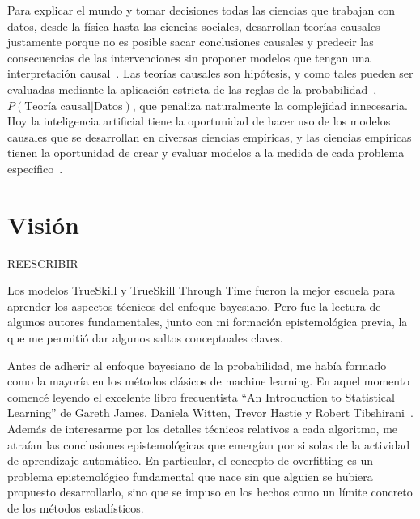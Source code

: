\documentclass[a4paper,11pt]{book}
\theoremstyle{definition}
\begin{document}
%

Para explicar el mundo y tomar decisiones todas las ciencias que trabajan con datos, desde la f\'isica hasta las ciencias sociales, desarrollan teor\'ias causales justamente porque no es posible sacar conclusiones causales y predecir las consecuencias de las intervenciones sin proponer modelos que tengan una interpretaci\'on causal~\cite{pearl2009-causality, peters2017-causalInference}.
%
Las teor\'ias causales son hip\'otesis, y como tales pueden ser evaluadas mediante la aplicaci\'on estricta de las reglas de la probabilidad~\cite{winn2012-causality}, $P(\text{Teor\'ia causal}|\text{Datos})$, que penaliza naturalmente la complejidad innecesaria.
%
Hoy la inteligencia artificial tiene la oportunidad de hacer uso de los modelos causales que se desarrollan en diversas ciencias emp\'iricas, y las ciencias emp\'iricas tienen la oportunidad de crear y evaluar modelos a la medida de cada problema espec\'ifico~\cite{murphy-pmlBook1,murphy-pmlBook2, Bishop2013, Bishop2006}.

\section{Visi\'on}

REESCRIBIR

Los modelos TrueSkill y TrueSkill Through Time fueron la mejor escuela para aprender los aspectos t\'ecnicos del enfoque bayesiano.
%
Pero fue la lectura de algunos autores fundamentales, junto con mi formaci\'on epistemol\'ogica previa, la que me permiti\'o dar algunos saltos conceptuales claves.


Antes de adherir al enfoque bayesiano de la probabilidad, me hab\'ia formado como la mayor\'ia en los m\'etodos cl\'asicos de machine learning.
%
En aquel momento comenc\'e leyendo el excelente libro frecuentista ``An Introduction to Statistical Learning'' de Gareth James, Daniela Witten, Trevor Hastie y Robert Tibshirani~\cite{james2013-introductionToStatisticalLearning}.
%
Adem\'as de interesarme por los detalles t\'ecnicos relativos a cada algoritmo, me atra\'ian las conclusiones epistemol\'ogicas que emerg\'ian por si solas de la actividad de aprendizaje autom\'atico.
%
En particular, el concepto de overfitting es un problema epistemol\'ogico fundamental que nace sin que alguien se hubiera propuesto desarrollarlo, sino que se impuso en los hechos como un l\'imite concreto de los m\'etodos estad\'isticos.

\end{document}
